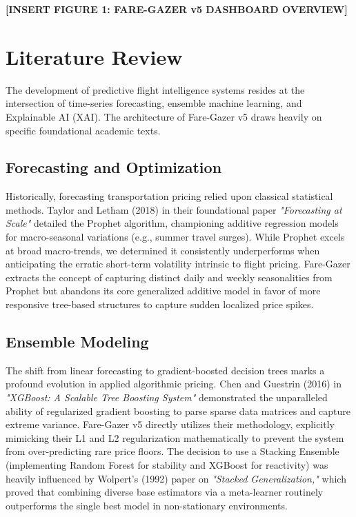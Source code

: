 \documentclass[12pt, a4paper]{article}
\begin{document}
\vspace{0.5in}
\begin{center}
    \textbf{[INSERT FIGURE 1: FARE-GAZER v5 DASHBOARD OVERVIEW]}
\end{center}
\vspace{0.5in}

\newpage

\section{Literature Review}

The development of predictive flight intelligence systems resides at the intersection of time-series forecasting, ensemble machine learning, and Explainable AI (XAI). The architecture of Fare-Gazer v5 draws heavily on specific foundational academic texts.

\subsection{Forecasting and Optimization}
Historically, forecasting transportation pricing relied upon classical statistical methods. Taylor and Letham (2018) in their foundational paper \textit{"Forecasting at Scale"} detailed the Prophet algorithm, championing additive regression models for macro-seasonal variations (e.g., summer travel surges). While Prophet excels at broad macro-trends, we determined it consistently underperforms when anticipating the erratic short-term volatility intrinsic to flight pricing. Fare-Gazer extracts the concept of capturing distinct daily and weekly seasonalities from Prophet but abandons its core generalized additive model in favor of more responsive tree-based structures to capture sudden localized price spikes.

\subsection{Ensemble Modeling}
The shift from linear forecasting to gradient-boosted decision trees marks a profound evolution in applied algorithmic pricing. Chen and Guestrin (2016) in \textit{"XGBoost: A Scalable Tree Boosting System"} demonstrated the unparalleled ability of regularized gradient boosting to parse sparse data matrices and capture extreme variance. Fare-Gazer v5 directly utilizes their methodology, explicitly mimicking their L1 and L2 regularization mathematically to prevent the system from over-predicting rare price floors. The decision to use a Stacking Ensemble (implementing Random Forest for stability and XGBoost for reactivity) was heavily influenced by Wolpert's (1992) paper on \textit{"Stacked Generalization,"} which proved that combining diverse base estimators via a meta-learner routinely outperforms the single best model in non-stationary environments.
\end{document}
